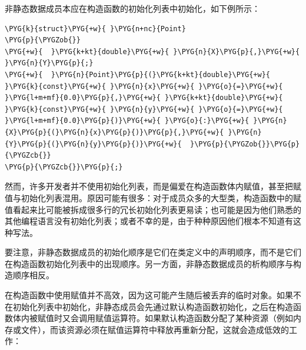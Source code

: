 非静态数据成员本应在构造函数的初始化列表中初始化，如下例所示：



\begin{codeblockbg}
\begin{Verbatim}[commandchars=\\\{\},breaklines=true,breakanywhere=true,fontsize=\codefont,xleftmargin=17bp]
\PYG{k}{struct}\PYG{+w}{ }\PYG{n+nc}{Point}
\PYG{p}{\PYGZob{}}
\PYG{+w}{  }\PYG{k+kt}{double}\PYG{+w}{ }\PYG{n}{X}\PYG{p}{,}\PYG{+w}{ }\PYG{n}{Y}\PYG{p}{;}
\PYG{+w}{  }\PYG{n}{Point}\PYG{p}{(}\PYG{k+kt}{double}\PYG{+w}{ }\PYG{k}{const}\PYG{+w}{ }\PYG{n}{x}\PYG{+w}{ }\PYG{o}{=}\PYG{+w}{ }\PYG{l+m+mf}{0.0}\PYG{p}{,}\PYG{+w}{ }\PYG{k+kt}{double}\PYG{+w}{ }\PYG{k}{const}\PYG{+w}{ }\PYG{n}{y}\PYG{+w}{ }\PYG{o}{=}\PYG{+w}{ }\PYG{l+m+mf}{0.0}\PYG{p}{)}\PYG{+w}{ }\PYG{o}{:}\PYG{+w}{ }\PYG{n}{X}\PYG{p}{(}\PYG{n}{x}\PYG{p}{)}\PYG{p}{,}\PYG{+w}{ }\PYG{n}{Y}\PYG{p}{(}\PYG{n}{y}\PYG{p}{)}\PYG{+w}{  }\PYG{p}{\PYGZob{}}\PYG{p}{\PYGZcb{}}
\PYG{p}{\PYGZcb{}}\PYG{p}{;}
\end{Verbatim}
\end{codeblockbg}



然而，许多开发者并不使用初始化列表，而是偏爱在构造函数体内赋值，甚至把赋值与初始化列表混用。原因可能有很多：对于成员众多的大型类，构造函数中的赋值看起来比可能被拆成很多行的冗长初始化列表更易读；也可能是因为他们熟悉的其他编程语言没有初始化列表；或者不幸的是，由于种种原因他们根本不知道有这种写法。



\begin{myNote}
要注意，非静态数据成员的初始化顺序是它们在类定义中的声明顺序，而不是它们在构造函数初始化列表中的出现顺序。另一方面，非静态数据成员的析构顺序与构造顺序相反。
\end{myNote}



在构造函数中使用赋值并不高效，因为这可能产生随后被丢弃的临时对象。如果不在初始化列表中初始化，非静态成员会先通过默认构造函数初始化，之后在构造函数体内被赋值时又会调用赋值运算符。如果默认构造函数分配了某种资源（例如内存或文件），而该资源必须在赋值运算符中释放再重新分配，这就会造成低效的工作：



